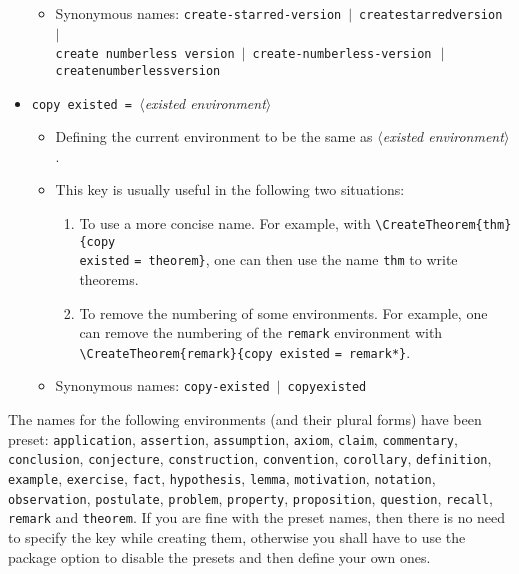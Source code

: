 \documentclass[classical]{einfart}
\newcommand{\meta}[1]{$\langle${\normalfont\itshape#1}$\rangle$}
\newcommand{\packageoption}[1]{\textcolor{code-option}{\texttt{#1}}}
\newcommand{\commandoption}[1]{\textcolor{code-keys}{\texttt{#1}}}
\newenvironment{tip}[1][Tip]
  {%
    \LocallyStopLineNumbers%
    \begin{tcolorbox}[breakable,
        enhanced,
        width = \textwidth,
        colback = paper, colbacktitle = paper,
        colframe = gray!50, boxrule=0.2mm,
        coltitle = black,
        fonttitle = \sffamily,
        attach boxed title to top left = {yshift=-\tcboxedtitleheight/2, xshift=.5cm},
        boxed title style = {boxrule=0pt, colframe=paper},
        before skip = 3mm,
        after skip = 3mm,
        top = 2.5mm,
        bottom = 1.5mm,
        title={\scshape\sffamily #1}]%
  }
  {%
    \end{tcolorbox}%
    \ResumeLineNumbers%
  }
\begin{document}
\begin{itemize}[label=,leftmargin=1.25em,itemindent=-1.25em]
\begin{itemize}
            \item Synonymous names: \commandoption{create-starred-version} \,$|$\, \commandoption{createstarredversion} \,$|$\, \\\phantom{Synonymous names: }\commandoption{create numberless version} \,$|$\, \commandoption{create-numberless-version}~\,$|$\\\phantom{Synonymous names: }\commandoption{createnumberlessversion}
        \end{itemize}
    \item \commandoption{copy existed}\lstinline| = |\meta{existed environment}
        \begin{itemize}
            \item Defining the current environment to be the same as \meta{existed environment}.
            \item This key is usually useful in the following two situations:
                \begin{enumerate}
                    \item To use a more concise name. For example, with \lstinline|\CreateTheorem{thm}{|\commandoption{copy \\existed} \lstinline|= theorem}|, one can then use the name \texttt{thm} to write theorems.
                    \item To remove the numbering of some environments. For example, one can remove the numbering of the \texttt{remark} environment with \lstinline|\CreateTheorem{remark}{|\commandoption{copy existed} \lstinline|= remark*}|.
                \end{enumerate}
            \item Synonymous names: \commandoption{copy-existed} \,$|$\, \commandoption{copyexisted}
        \end{itemize}
\end{itemize}

\begin{tip}
    The names for the following environments (and their plural forms) have been preset: \texttt{application}, \texttt{assertion}, \texttt{assumption}, \texttt{axiom}, \texttt{claim}, \texttt{commentary}, \texttt{conclusion}, \texttt{conjecture}, \texttt{construction}, \texttt{convention}, \texttt{corollary}, \texttt{definition}, \texttt{example}, \texttt{exercise}, \texttt{fact}, \texttt{hypothesis}, \texttt{lemma}, \texttt{motivation}, \texttt{notation}, \texttt{observation}, \texttt{postulate}, \texttt{problem}, \texttt{property}, \texttt{proposition}, \texttt{question}, \texttt{recall}, \texttt{remark} and \texttt{theorem}. If you are fine with the preset names, then there is no need to specify the key \textquote{\commandoption{name}} while creating them, otherwise you shall have to use the package option \textquote{\packageoption{no preset names}} to disable the presets and then define your own ones.
\end{tip}
\end{document}

